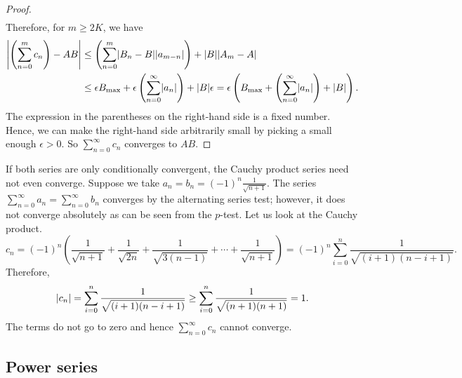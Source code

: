 \begin{proof}
\begin{equation*}
\begin{split}
\end{split}
\end{equation*}
Therefore, for $m \geq 2K$, we have
\begin{equation*}
\begin{split}
\left\lvert {\left(\sum_{n=0}^m c_n \right) - AB} \right\rvert
& \leq
\left(
\sum_{n=0}^m
  \lvert { B_n -  B } \rvert \lvert {a_{m-n}} \rvert
\right)
+
\lvert {B} \rvert\lvert {A_m - A} \rvert
\\
& \leq
\epsilon
B_{\text{max}}
+
\epsilon
\left(
\sum_{n=0}^\infty \lvert {a_{n}} \rvert
\right)
+
\lvert {B} \rvert\epsilon
=
\epsilon 
\left(
B_{\text{max}}
+
\left(
\sum_{n=0}^\infty \lvert {a_{n}} \rvert
\right)
+
\lvert {B} \rvert
\right) .
\end{split}
\end{equation*}
The expression in the parentheses on the right-hand side
is a fixed number.
Hence,
we can make the right-hand side arbitrarily small by picking a small enough
$\epsilon> 0$.  So $\sum_{n=0}^\infty c_n$ converges to $AB$.
\end{proof}

\begin{example}
If both series are only conditionally convergent, the Cauchy product series
need not even converge.
Suppose we take $a_n = b_n = {(-1)}^n \frac{1}{\sqrt{n+1}}$.
The series $\sum_{n=0}^\infty a_n = \sum_{n=0}^\infty b_n$
converges
by the alternating series test; however, it does not converge
absolutely as can be seen from the $p$-test.  Let us look
at the Cauchy product.
\begin{equation*}
c_n
= 
{(-1)}^n
\left(
\frac{1}{\sqrt{n+1}} + 
\frac{1}{\sqrt{2n}} + 
\frac{1}{\sqrt{3(n-1)}} + \cdots +
\frac{1}{\sqrt{n+1}}
\right)
=
{(-1)}^n
\sum_{i=0}^n \frac{1}{\sqrt{(i+1)(n-i+1)}} .
\end{equation*}
Therefore,
\begin{equation*}
\lvert {c_n} \rvert 
=
\sum_{i=0}^n \frac{1}{\sqrt{(i+1)(n-i+1)}} 
\geq
\sum_{i=0}^n \frac{1}{\sqrt{(n+1)(n+1)}} 
= 1 .
\end{equation*}
The terms do not go to zero and hence $\sum_{n=0}^\infty c_n$ cannot converge.
\end{example}

\subsection{Power series}

